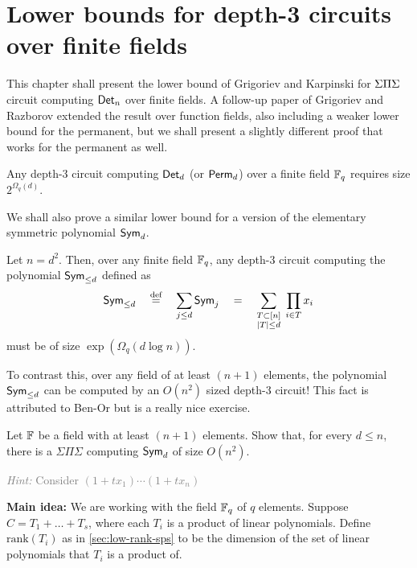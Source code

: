 \chapter{Lower bounds for depth-3 circuits over finite fields}\label{chap:GK}

This chapter shall present the lower bound of Grigoriev and Karpinski
\cite{grigoriev98} for $\Sigma\Pi\Sigma$ circuit computing $\operatorname{\mathsf{Det}}_n$ over finite
fields. 
A follow-up paper of Grigoriev and Razborov \cite{gr00}
extended the result over function fields, also including a weaker
lower bound for the permanent, but we shall present a slightly
different proof that works for the permanent as well.

\begin{theorem}\cite{grigoriev98}\label{thm:gk-main-thm}
  Any depth-3 circuit computing $\operatorname{\mathsf{Det}}_d$ (or $\operatorname{\mathsf{Perm}}_d$) over a finite
  field $\mathbb{F}_q$ requires size $2^{\Omega_q(d)}$.
\end{theorem}

We shall also prove a similar lower bound for a version of the elementary symmetric polynomial $\operatorname{\mathsf{Sym}}_d$. 

\begin{theorem}\label{thm:esym-finitefields}
  Let $n = d^2$. 
  Then, over any finite field $\mathbb{F}_q$, any depth-$3$ circuit computing the polynomial $\operatorname{\mathsf{Sym}}_{\leq d}$ defined as
\[
\operatorname{\mathsf{Sym}}_{\leq d} \quad \stackrel{\text{def}}{=} \quad \sum_{j\leq d} \operatorname{\mathsf{Sym}}_j \quad = \quad \sum_{\substack{T \subset [n]\\ |T| \leq d}} \; \prod_{i\in T} x_i
\]
must be of size $\exp(\Omega_q(d \log n))$. 
\end{theorem}

To contrast this, over any field of at least $(n+1)$ elements, the polynomial $\operatorname{\mathsf{Sym}}_{\leq d}$ can be computed by an $O(n^2)$ sized depth-$3$ circuit! This fact is attributed to Ben-Or but is a really nice exercise. 

\begin{exercise} 
Let $\mathbb{F}$ be a field with at least $(n+1)$ elements. 
Show that, for every $d \leq n$, there is a $\Sigma\Pi\Sigma$ 
computing  $\operatorname{\mathsf{Sym}}_{d}$ of size $O(n^2)$. 

\noindent
\textcolor{gray}{\emph{Hint: } Consider $(1+tx_1) \cdots (1+tx_n)$}
\end{exercise}



{\bf Main idea:} We are working with the field $\mathbb{F}_q$ of $q$ elements. 
Suppose $C = T_1 + \dots + T_s$,
where each $T_i$ is a product of linear polynomials. 
Define
$\mathrm{rank}(T_i)$ as in \autoref{sec:low-rank-sps} to be the
dimension of the set of linear polynomials that $T_i$ is a product of.

